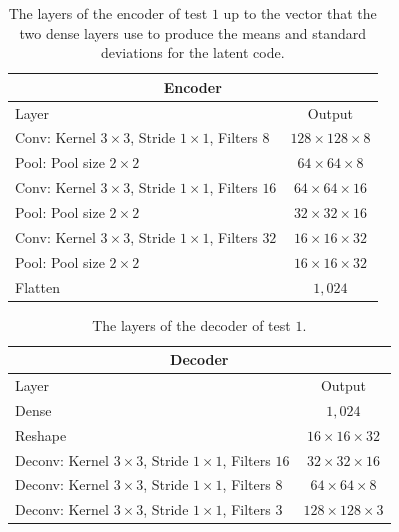 \begin{center}
    \begin{table}[H] \label{table_encoder_pooling}
        \centering
        \begin{tabular}{ | l | c | }
            \multicolumn{2}{c}{Encoder} \\ \hline
            Layer & Output\\ \hline
            Conv: Kernel $3\times3$, Stride $1\times1$, Filters $8  $    & $128\times 128\times 8  $    \\
            Pool: Pool size $2\times2$                                   & $64\times 64\times 8  $  \\
            Conv: Kernel $3\times3$, Stride $1\times1$, Filters $16 $    & $64\times 64\times 16 $    \\
            Pool: Pool size $2\times2$                                   & $32\times 32\times 16  $  \\
            Conv: Kernel $3\times3$, Stride $1\times1$, Filters $32 $    & $16\times 16\times 32 $    \\
            Pool: Pool size $2\times2$                                   & $16\times 16\times 32  $  \\
            Flatten                                                              & $1,024$            \\
            \hline
        \end{tabular} 
        \caption{The layers of the encoder of test $1$ up to the vector that the two dense layers use to produce 
        the means and standard deviations for the latent code.}
    \end{table}
\end{center}
\vspace{-4em}
\begin{center}
    \begin{table}[H]
        \centering
        \begin{tabular}{ | l | c | }
            \multicolumn{2}{c}{Decoder} \\ \hline
            Layer & Output\\ \hline
            Dense                                                            & $1,024$                   \\
            Reshape                                                          & $16\times 16\times  32 $  \\
            Deconv: Kernel $3\times3$, Stride $1\times1$, Filters $16 $      & $32\times 32\times  16 $  \\
            Deconv: Kernel $3\times3$, Stride $1\times1$, Filters $8  $      & $64\times 64\times  8  $  \\
            Deconv: Kernel $3\times3$, Stride $1\times1$, Filters $3  $      & $128\times 128\times3  $  \\
            \hline
        \end{tabular} 
        \caption{The layers of the decoder of test $1$.}
    \end{table}
\end{center}


